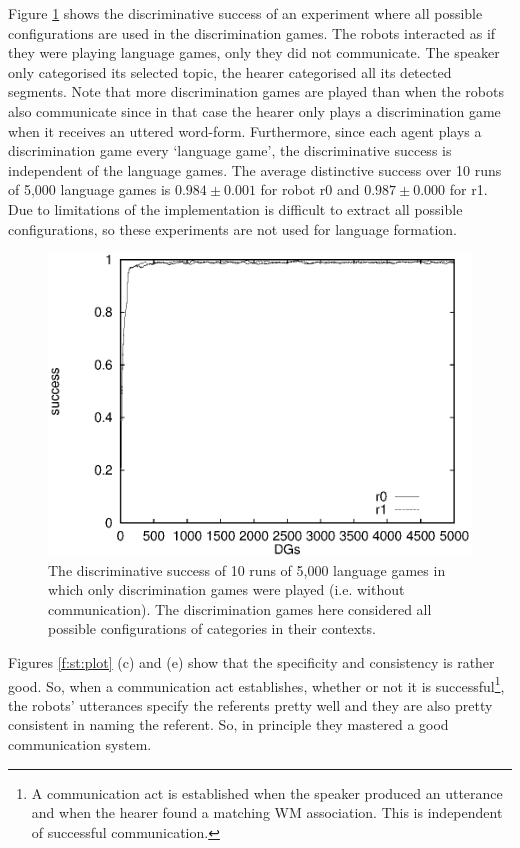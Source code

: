 Figure \ref{f:st:ds} shows the discriminative success of an experiment where all possible configurations are used in the discrimination games. The robots interacted as if they were playing language games, only they did not communicate. The speaker only categorised its selected topic, the hearer categorised all its detected segments. Note that more discrimination games are played than when the robots also communicate since in that case the hearer only plays a discrimination game when it receives an uttered word-form. Furthermore, since each agent plays a discrimination game every `language game', the discriminative success is independent of the language games. The average distinctive success over 10 runs of 5,000 language games is $0.984 \pm 0.001$ for robot r0 and $0.987 \pm 0.000$ for r1. Due to limitations of the implementation is difficult to extract all possible configurations, so these experiments are not used for language formation.

\begin{figure}[t]
\centerline{\includegraphics[width=12cm]{basic/dsall.eps}}
\caption{The discriminative success of 10 runs of 5,000 language games in which only discrimination games were played (i.e. without communication). The discrimination games here considered all possible configurations of categories in their contexts.}
\label{f:st:ds}
\end{figure}

Figures \ref{f:st:plot} (c) and (e) show that the specificity and consistency is rather good. So, when a communication act establishes, whether or not it is successful\footnote{A communication act is established when the speaker produced an utterance and when the hearer found a matching WM association. This is independent of successful communication.}, the robots' utterances specify the referents pretty well and they are also pretty consistent in naming the referent. So, in principle they mastered a good communication system.

